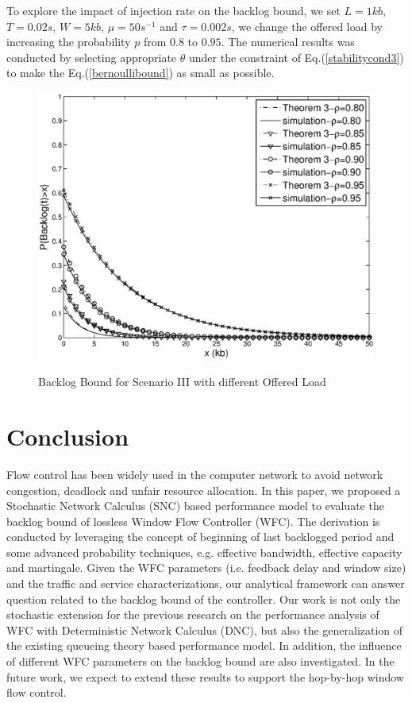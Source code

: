\documentclass[paper]{ieice}
\begin{document}
To explore the impact of injection rate on the backlog bound, we set $L=1kb$, $T=0.02s$, $W=5kb$, $\mu=50s^{-1}$ and $\tau=0.002s$, we change the offered load by increasing the probability $p$ from $0.8$ to $0.95$. The numerical results was conducted by selecting appropriate $\theta$ under the constraint of Eq.(\ref{stabilitycond3}) to make the Eq.(\ref{bernoullibound}) as small as possible.
\begin{figure}
  \centering
  \includegraphics[scale=0.45]{figures/backlogrho.eps}\\
  \caption{Backlog Bound for Scenario III with different Offered Load}\label{result2}
\end{figure}

\section{Conclusion}\label{concluson}
Flow control has been widely used in the computer network to avoid network congestion, deadlock and unfair resource allocation. In this paper, we proposed a Stochastic Network Calculus (SNC) based performance model to evaluate the backlog bound of lossless Window Flow Controller (WFC). The derivation is conducted by leveraging the concept of beginning of last backlogged period and some advanced probability techniques, e.g. effective bandwidth, effective capacity and martingale. Given the WFC parameters (i.e. feedback delay and window size) and the traffic and service characterizations, our analytical framework can answer question related to the backlog bound of the controller. Our work is not only the stochastic extension for the previous research on the performance analysis of WFC with Deterministic Network Calculus (DNC), but also the generalization of the existing queueing theory based performance model. In addition, the influence of different WFC parameters on the backlog bound are also investigated. In the future work, we expect to extend these results to support the hop-by-hop window flow control.
\end{document}
